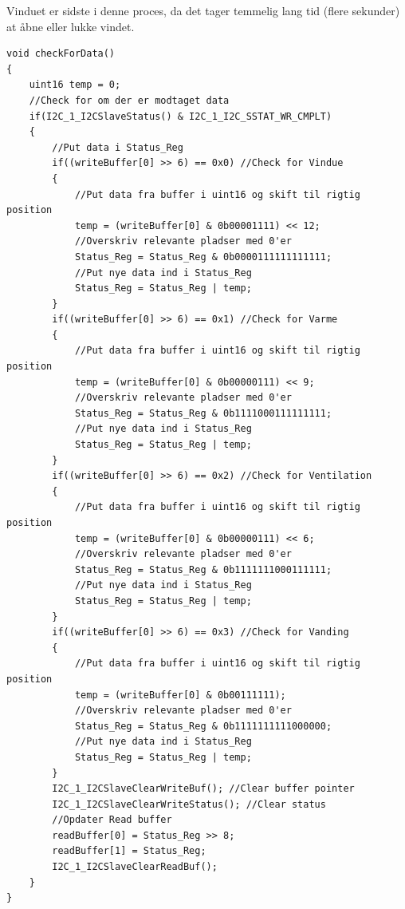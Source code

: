 Vinduet er sidste i denne proces, da det tager temmelig lang tid (flere sekunder) at åbne eller lukke vindet. 

\clearpage

\begin{lstlisting}[caption=Udsnit af checkForData.c for PSoC4 i Aktuator, label=fig:checkForData_aktuator]
void checkForData()
{
    uint16 temp = 0;
    //Check for om der er modtaget data
    if(I2C_1_I2CSlaveStatus() & I2C_1_I2C_SSTAT_WR_CMPLT)
    {
        //Put data i Status_Reg            
        if((writeBuffer[0] >> 6) == 0x0) //Check for Vindue
        {
            //Put data fra buffer i uint16 og skift til rigtig position
            temp = (writeBuffer[0] & 0b00001111) << 12; 
            //Overskriv relevante pladser med 0'er
            Status_Reg = Status_Reg & 0b0000111111111111;
            //Put nye data ind i Status_Reg
            Status_Reg = Status_Reg | temp;                
        }           
        if((writeBuffer[0] >> 6) == 0x1) //Check for Varme
        {
            //Put data fra buffer i uint16 og skift til rigtig position
            temp = (writeBuffer[0] & 0b00000111) << 9; 
            //Overskriv relevante pladser med 0'er
            Status_Reg = Status_Reg & 0b1111000111111111;
            //Put nye data ind i Status_Reg
            Status_Reg = Status_Reg | temp;                
        }           
        if((writeBuffer[0] >> 6) == 0x2) //Check for Ventilation
        {
            //Put data fra buffer i uint16 og skift til rigtig position
            temp = (writeBuffer[0] & 0b00000111) << 6; 
            //Overskriv relevante pladser med 0'er
            Status_Reg = Status_Reg & 0b1111111000111111;
            //Put nye data ind i Status_Reg
            Status_Reg = Status_Reg | temp;                
        }            
        if((writeBuffer[0] >> 6) == 0x3) //Check for Vanding
        {
            //Put data fra buffer i uint16 og skift til rigtig position
            temp = (writeBuffer[0] & 0b00111111); 
            //Overskriv relevante pladser med 0'er
            Status_Reg = Status_Reg & 0b1111111111000000;
            //Put nye data ind i Status_Reg
            Status_Reg = Status_Reg | temp;                
        }                    
        I2C_1_I2CSlaveClearWriteBuf(); //Clear buffer pointer
        I2C_1_I2CSlaveClearWriteStatus(); //Clear status                       
        //Opdater Read buffer
        readBuffer[0] = Status_Reg >> 8;
        readBuffer[1] = Status_Reg;     
        I2C_1_I2CSlaveClearReadBuf();
    }
}
\end{lstlisting}

